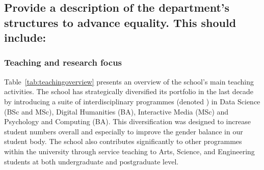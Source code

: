 \subsection{Provide a description of the department’s structures to advance equality. This should include:}  

\subsubsection{Teaching and research focus}



Table~\ref{tab:teachingoverview} presents an overview of the school's
main teaching activities. 
The school has strategically diversified its portfolio in the
last decade by introducing a suite of interdisciplinary programmes
(denoted \interdis)
in Data Science (BSc and MSc), Digital Humanities (BA), Interactive 
Media (MSc) and Psychology and Computing (BA). This 
diversification was designed to increase student  numbers overall and  
especially to improve the gender balance in our student body. 
The school also contributes significantly to other programmes  within 
the university through service teaching to Arts, Science, and 
Engineering students at both undergraduate and postgraduate level.





